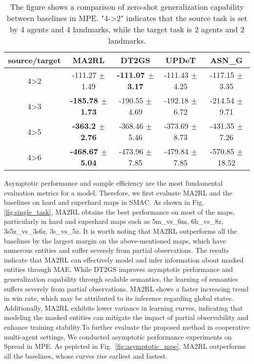 \begin{table*}[t]
    \centering
    \caption{The figure shows a comparison of zero-shot generalization capability between baselines in MPE. "4->2" indicates that the source task is set by 4 agents and 4 landmarks, while the target task is 2 agents and 2 landmarks.}
    \begin{tabular}{|c|c|c|c|c|}
        \hline
        \textbf{source/target} & \textbf{MA2RL} & \textbf{DT2GS} & \textbf{UPDeT} & \textbf{ASN\_G} \\ 
        \hline
        4>2 & -111.27 $\pm$ 1.49 & \textbf{-111.07 $\pm$ 3.17} & -111.43 $\pm$ 4.25 & -117.15 $\pm$ 3.35 \\ 
        4>3 & \textbf{-185.78 $\pm$ 1.73} & -190.55 $\pm$ 4.69 & -192.18 $\pm$ 6.72 & -214.54 $\pm$ 9.71 \\ 
        4>5 & \textbf{-363.2 $\pm$ 2.76} & -368.46 $\pm$ 5.46 & -373.69 $\pm$ 8.73 & -431.35 $\pm$ 7.26 \\ 
        4>6 & \textbf{-468.67 $\pm$ 5.04} & -473.96 $\pm$ 7.85 & -479.84 $\pm$ 7.85 & -570.85 $\pm$ 18.52 \\ 
        \hline
    \end{tabular}
    \label{mpe_zeroshot2}
\end{table*}
Asymptotic performance and sample efficiency are the most fundamental evaluation metrics for a model. Therefore, we first evaluate MA2RL and the baselines on hard and superhard maps in SMAC. As shown in Fig.\ref{fig:single_task}, MA2RL obtains the best performance on most of the maps, particularly in hard and superhard maps such as 5m\_vs\_6m, 6h\_vs\_8z, 3s5z\_vs\_3s6z, 3s\_vs\_5z. It is worth noting that MA2RL outperforms all the baselines by the largest margin on the above-mentioned maps, which have numerous entities and suffer severely from partial observations. The results indicate that MA2RL can effectively model and infer information about masked entities through MAE. While DT2GS improves asymptotic performance and generalization capability through scalable semantics, the learning of semantics suffers severely from partial observations. MA2RL shows a faster increasing trend in win rate, which may be attributed to its inference regarding global states. Additionally, MA2RL exhibits lower variance in learning curves, indicating that modeling the masked entities can mitigate the impact of partial observability and enhance training stability.To further evaluate the proposed method in cooperative multi-agent settings, We conducted asymptotic performance experiments on Spread in MPE. As pepicted in Fig.~\ref{fig:asymptotic_mpe}, MA2RL outperforms all the baselines, whose curves rise earliest and fastest.

